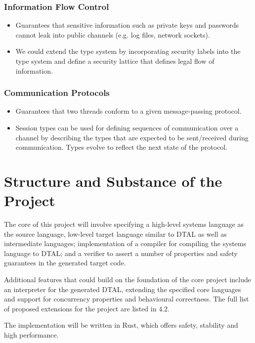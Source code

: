 \documentclass[a4paper, 12pt]{article}
\begin{document}
\subsubsection*{Information Flow Control}
\begin{itemize}
  \item Guarantees that sensitive information such as private keys and passwords cannot leak into public channels (e.g. log files, network sockets).
  \item We could extend the type system by incorporating security labels into the type system and define a security lattice that defines legal flow of information.
\end{itemize}

\subsubsection*{Communication Protocols}
\begin{itemize}
  \item Guarantees that two threads conform to a given message-passing protocol.
  \item Session types can be used for defining sequences of communication over a channel by describing the types that are expected to be sent/received during communication. Types evolve to reflect the next state of the protocol.
\end{itemize}

\section{Structure and Substance of the Project}

The core of this project will involve specifying a high-level systems language as the source language, low-level target language similar to DTAL as well as intermediate languages; implementation of a compiler for compiling the systems language to DTAL; and a verifier to assert a number of properties and safety guarantees in the generated target code.

Additional features that could build on the foundation of the core project include an interpreter for the generated DTAL, extending the specified core languages and support for concurrency properties and behavioural correctness. The full list of proposed extensions for the project are listed in 4.2.

The implementation will be written in Rust, which offers safety, stability and high performance.
\end{document}
